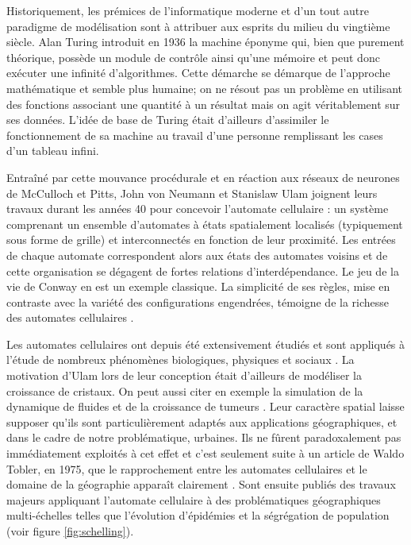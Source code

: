 \documentclass[12pt]{article}
\begin{document}
Historiquement, les prémices de l'informatique moderne et d'un tout
autre paradigme de modélisation sont à attribuer aux esprits du milieu
du vingtième siècle. Alan Turing introduit en 1936 la machine éponyme
qui, bien que purement théorique, possède un module de contrôle ainsi
qu'une mémoire et peut donc exécuter une infinité d'algorithmes. Cette
démarche se démarque de l'approche mathématique et semble plus
humaine; on ne résout pas un problème en utilisant des fonctions
associant une quantité à un résultat mais on agit véritablement sur
ses données. L'idée de base de Turing était d'ailleurs d'assimiler le
fonctionnement de sa machine au travail d'une personne remplissant les
cases d'un tableau infini.

Entraîné par cette mouvance procédurale et en réaction aux réseaux de
neurones de McCulloch et Pitts, John von Neumann et Stanislaw Ulam
joignent leurs travaux durant les années 40 pour concevoir l'automate
cellulaire : un système comprenant un ensemble d'automates à états
spatialement localisés (typiquement sous forme de grille) et
interconnectés en fonction de leur proximité. Les entrées de chaque
automate correspondent alors aux états des automates voisins et de
cette organisation se dégagent de fortes relations
d'interdépendance. Le jeu de la vie de Conway en est un exemple
classique. La simplicité de ses règles, mise en contraste avec la
variété des configurations engendrées, témoigne de la richesse des
automates cellulaires \cite{Gardner1970}.

Les automates cellulaires ont depuis été extensivement étudiés et sont
appliqués à l'étude de nombreux phénomènes biologiques, physiques et
sociaux \cite{Ganguly2003}. La motivation d'Ulam lors de leur
conception était d'ailleurs de modéliser la croissance de cristaux. On
peut aussi citer en exemple la simulation de la dynamique de fluides
\cite{Frisch1986} et de la croissance de tumeurs
\cite{Kansal2000}. Leur caractère spatial laisse supposer qu'ils sont
particulièrement adaptés aux applications géographiques, et dans le
cadre de notre problématique, urbaines. Ils ne fûrent paradoxalement
pas immédiatement exploités à cet effet et c'est seulement suite à un
article de Waldo Tobler, en 1975, que le rapprochement entre les
automates cellulaires et le domaine de la géographie apparaît
clairement \cite{Tobler1975}. Sont ensuite publiés des travaux majeurs
appliquant l'automate cellulaire à des problématiques géographiques
multi-échelles telles que l'évolution d'épidémies \cite{Fu2003} et la
ségrégation de population \cite{Schelling1969} (voir figure
\ref{fig:schelling}).
\end{document}
